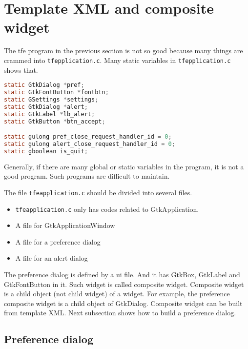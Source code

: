 \hypertarget{template-xml-and-composite-widget}{%
\section{Template XML and composite
widget}\label{template-xml-and-composite-widget}}

The tfe program in the previous section is not so good because many
things are crammed into \passthrough{\lstinline!tfepplication.c!}. Many
static variables in \passthrough{\lstinline!tfepplication.c!} shows
that.

\begin{lstlisting}[language=C]
static GtkDialog *pref;
static GtkFontButton *fontbtn;
static GSettings *settings;
static GtkDialog *alert;
static GtkLabel *lb_alert;
static GtkButton *btn_accept;

static gulong pref_close_request_handler_id = 0;
static gulong alert_close_request_handler_id = 0;
static gboolean is_quit;
\end{lstlisting}

Generally, if there are many global or static variables in the program,
it is not a good program. Such programs are difficult to maintain.

The file \passthrough{\lstinline!tfeapplication.c!} should be divided
into several files.

\begin{itemize}
\tightlist
\item
  \passthrough{\lstinline!tfeapplication.c!} only has codes related to
  GtkApplication.
\item
  A file for GtkApplicationWindow
\item
  A file for a preference dialog
\item
  A file for an alert dialog
\end{itemize}

The preference dialog is defined by a ui file. And it has GtkBox,
GtkLabel and GtkFontButton in it. Such widget is called composite
widget. Composite widget is a child object (not child widget) of a
widget. For example, the preference composite widget is a child object
of GtkDialog. Composite widget can be built from template XML. Next
subsection shows how to build a preference dialog.

\hypertarget{preference-dialog}{%
\subsection{Preference dialog}\label{preference-dialog}}

